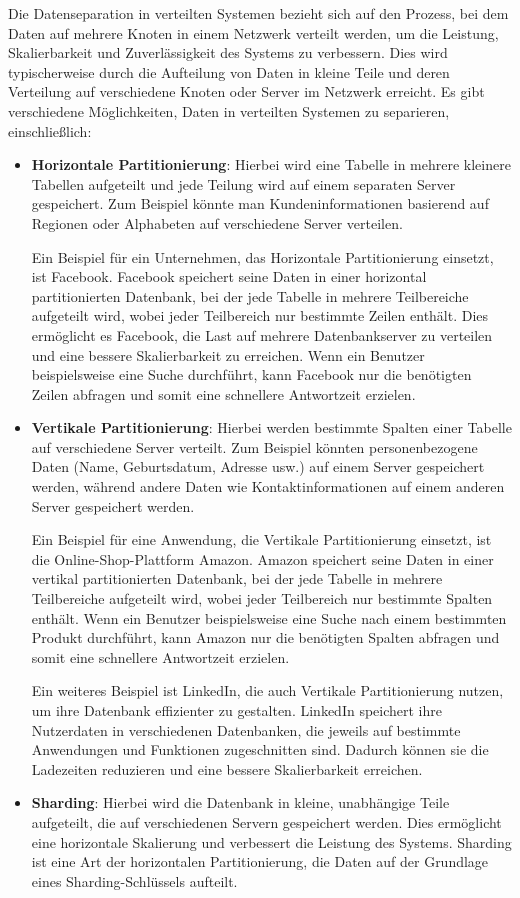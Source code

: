 Die Datenseparation in verteilten Systemen bezieht sich auf den Prozess, bei dem Daten auf mehrere Knoten in einem Netzwerk verteilt werden, um die Leistung, Skalierbarkeit und Zuverlässigkeit des Systems zu verbessern. Dies wird typischerweise durch die Aufteilung von Daten in kleine Teile und deren Verteilung auf verschiedene Knoten oder Server im Netzwerk erreicht.
Es gibt verschiedene Möglichkeiten, Daten in verteilten Systemen zu separieren, einschließlich:
\begin{itemize}
\item \textbf{Horizontale Partitionierung}: Hierbei wird eine Tabelle in mehrere kleinere Tabellen aufgeteilt und jede Teilung wird auf einem separaten Server gespeichert. Zum Beispiel könnte man Kundeninformationen basierend auf Regionen oder Alphabeten auf verschiedene Server verteilen.

Ein Beispiel für ein Unternehmen, das Horizontale Partitionierung einsetzt, ist Facebook. Facebook speichert seine Daten in einer horizontal partitionierten Datenbank, bei der jede Tabelle in mehrere Teilbereiche aufgeteilt wird, wobei jeder Teilbereich nur bestimmte Zeilen enthält. Dies ermöglicht es Facebook, die Last auf mehrere Datenbankserver zu verteilen und eine bessere Skalierbarkeit zu erreichen. Wenn ein Benutzer beispielsweise eine Suche durchführt, kann Facebook nur die benötigten Zeilen abfragen und somit eine schnellere Antwortzeit erzielen.
\item \textbf{Vertikale Partitionierung}: Hierbei werden bestimmte Spalten einer Tabelle auf verschiedene Server verteilt. Zum Beispiel könnten personenbezogene Daten (Name, Geburtsdatum, Adresse usw.) auf einem Server gespeichert werden, während andere Daten wie Kontaktinformationen auf einem anderen Server gespeichert werden.

Ein Beispiel für eine Anwendung, die Vertikale Partitionierung einsetzt, ist die Online-Shop-Plattform Amazon. Amazon speichert seine Daten in einer vertikal partitionierten Datenbank, bei der jede Tabelle in mehrere Teilbereiche aufgeteilt wird, wobei jeder Teilbereich nur bestimmte Spalten enthält. Wenn ein Benutzer beispielsweise eine Suche nach einem bestimmten Produkt durchführt, kann Amazon nur die benötigten Spalten abfragen und somit eine schnellere Antwortzeit erzielen.

Ein weiteres Beispiel ist LinkedIn, die auch Vertikale Partitionierung nutzen, um ihre Datenbank effizienter zu gestalten. LinkedIn speichert ihre Nutzerdaten in verschiedenen Datenbanken, die jeweils auf bestimmte Anwendungen und Funktionen zugeschnitten sind. Dadurch können sie die Ladezeiten reduzieren und eine bessere Skalierbarkeit erreichen.
\item \textbf{Sharding}: Hierbei wird die Datenbank in kleine, unabhängige Teile aufgeteilt, die auf verschiedenen Servern gespeichert werden. Dies ermöglicht eine horizontale Skalierung und verbessert die Leistung des Systems. Sharding ist eine Art der horizontalen Partitionierung, die Daten auf der Grundlage eines Sharding-Schlüssels aufteilt.


\end{itemize}
